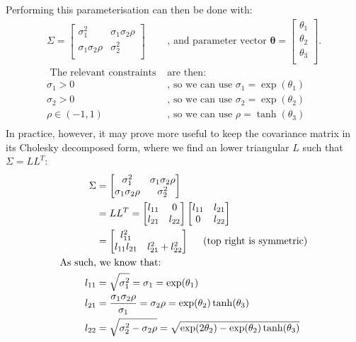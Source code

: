 \documentclass[a4paper, 12pt]{report}
\begin{document}
Performing this parameterisation can then be done with:
\begin{align*}
\Sigma = \begin{bmatrix}
 \sigma_1^2 & \sigma_1\sigma_2\rho \\
  \sigma_1\sigma_2\rho & \sigma_2^2 \\
\end{bmatrix}& \textrm{, and parameter vector } \boldsymbol{\theta}=\begin{bmatrix}
	\theta_1\\
	\theta_2\\
	\theta_3\\
\end{bmatrix}.\\
\textrm{ The relevant constraints }& \textrm{are then:}\\
	\sigma_1 > 0& \textrm{, so we can use } \sigma_1 = \exp(\theta_1)\\
	\sigma_2 > 0& \textrm{, so we can use } \sigma_2 = \exp(\theta_2)\\
	\rho \in (-1, 1) & \textrm{, so we can use } \rho = \tanh(\theta_3)\\
\end{align*}
In practice, however, it may prove more useful to keep the covariance matrix in its Cholesky decomposed form, where we find an lower triangular $L$ such that $\Sigma=LL^T$:
\begin{align*}
	\Sigma &= \begin{bmatrix}
 \sigma_1^2 & \sigma_1\sigma_2\rho \\
  \sigma_1\sigma_2\rho & \sigma_2^2 \\
\end{bmatrix}\\
&= LL^T = \begin{bmatrix}
 l_{11} & 0 \\
  l_{21} & l_{22} \\
\end{bmatrix}\begin{bmatrix}
 l_{11} & l_{21} \\
  0 & l_{22} \\
\end{bmatrix}\\
&=\begin{bmatrix}
 l_{11}^2 &  \\
  l_{11}l_{21} & l_{21}^2 + l_{22}^2 \\
\end{bmatrix}\hspace{0.5cm}\textrm{(top right is symmetric)}\\
\textrm{As such,}&\textrm{ we know that:}\\
	l_{11} &= \sqrt{\sigma_1^2} =\sigma_1=\exp(\theta_1)\\
	l_{21} &= \frac{\sigma_1\sigma_2\rho}{\sigma_1}=\sigma_2\rho=\exp(\theta_2)\tanh(\theta_3) \\
	l_{22} &= \sqrt{\sigma_2^2 - \sigma_2\rho} = \sqrt{\exp(2\theta_2)-\exp(\theta_2)\tanh(\theta_3)}
\end{align*}
\end{document}
